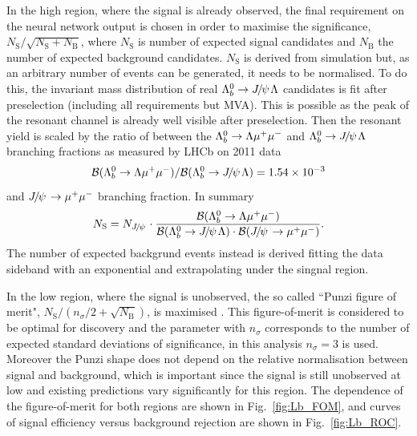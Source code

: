 In the high \qsq region, where the signal is already observed, the final requirement on the neural network output
is chosen in order to maximise the significance, $N_{\mathrm{S}}/\sqrt{N_{\mathrm{S}}+N_{\mathrm{B}}}$, where
$N_\mathrm{S}$ is number of expected signal candidates and $N_\mathrm{B}$ the number of expected background candidates.
$N_\mathrm{S}$ is derived from simulation but, as an arbitrary number of events can be generated, it
needs to be normalised. To do this, the invariant mass distribution of real $\Lb\to\jpsi\Lz$ candidates
is fit after preselection (including all requirements but MVA). This is possible as the peak of the resonant
channel is already well visible after preselection. Then the resonant yield is scaled by the ratio
of between the ${{\Lambda}^0_{b}}\rightarrow{\ensuremath{\Lambda}}{\ensuremath{\mu^+\mu^-}}$ and $\Lb\to\jpsi\Lz$ branching fractions as measured 
by LHCb on 2011 data 
\begin{equation}
\BR(\Lb\to\Lz\mumu) / \BR(\Lb\to\jpsi\Lz) =  1.54 \times 10^{-3}
\end{equation}
\noindent
and $\jpsi\to\mumu$ branching fraction. In summary
\begin{equation}
N_\mathrm{S} = N_\jpsi \cdot \frac{\BR(\Lb\to\Lz\mumu)}{\BR(\Lb\to\jpsi\Lz) \cdot \BR(\jpsi\to\mumu) }.
\end{equation}
%
The number of expected backgrund events instead is derived fitting the data
sideband with an exponential and extrapolating under the singnal region.

In the low \qsq region, where the signal is unobserved, the so called ``Punzi figure of merit",
$N_{\mathrm{S}}/(n_\sigma/2+\sqrt{N_{\mathrm{B}}})$, is maximised \cite{Punzi:2003bu}.
This figure-of-merit is considered to be optimal for discovery and the parameter with $n_\sigma$ corresponds to
the number of expected standard deviations of significance, in this analysis $n_\sigma = 3$ is used.
Moreover the Punzi shape does not depend on the relative normalisation between signal and background, which
is important since the signal is still unobserved at low \qsq and existing predictions vary significantly
for this region. The dependence of the figure-of-merit for both \qsq regions are shown in Fig.~\ref{fig:Lb_FOM}, and curves
of signal efficiency versus background rejection are shown in Fig.~\ref{fig:Lb_ROC}.

